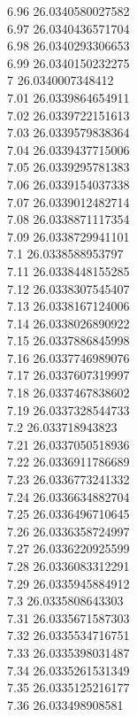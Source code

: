 {6.96	26.0340580027582\\
6.97	26.0340436571704\\
6.98	26.0340293306653\\
6.99	26.0340150232275\\
7	26.0340007348412\\
7.01	26.0339864654911\\
7.02	26.0339722151613\\
7.03	26.0339579838364\\
7.04	26.0339437715006\\
7.05	26.0339295781383\\
7.06	26.0339154037338\\
7.07	26.0339012482714\\
7.08	26.0338871117354\\
7.09	26.0338729941101\\
7.1	26.0338588953797\\
7.11	26.0338448155285\\
7.12	26.0338307545407\\
7.13	26.0338167124006\\
7.14	26.0338026890922\\
7.15	26.0337886845998\\
7.16	26.0337746989076\\
7.17	26.0337607319997\\
7.18	26.0337467838602\\
7.19	26.0337328544733\\
7.2	26.033718943823\\
7.21	26.0337050518936\\
7.22	26.0336911786689\\
7.23	26.0336773241332\\
7.24	26.0336634882704\\
7.25	26.0336496710645\\
7.26	26.0336358724997\\
7.27	26.0336220925599\\
7.28	26.0336083312291\\
7.29	26.0335945884912\\
7.3	26.0335808643303\\
7.31	26.0335671587303\\
7.32	26.0335534716751\\
7.33	26.0335398031487\\
7.34	26.0335261531349\\
7.35	26.0335125216177\\
7.36	26.033498908581\\
}
